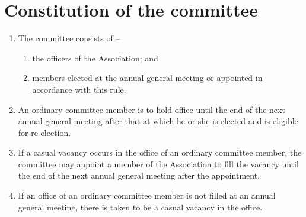 \documentclass[a4paper,11pt]{article}
\begin{document}
\section{Constitution of the committee}
\begin{enumerate}
	\item The committee consists of --
	\begin{enumerate}
		\item the officers of the Association; and
		\item \orgCommitteeExtras{} members elected at the annual general meeting or appointed in accordance with this rule.
	\end{enumerate}
	
	\item An ordinary committee member is to hold office until the end of the next annual general meeting after that at which he or she is elected and is eligible for re-election.
	\item If a casual vacancy occurs in the office of an ordinary committee member, the committee may appoint a member of the Association to fill the vacancy until the end of the next annual general meeting after the appointment.
	\item If an office of an ordinary committee member is not filled at an annual general meeting, there is taken to be a casual vacancy in the office.
\end{enumerate}
\end{document}
